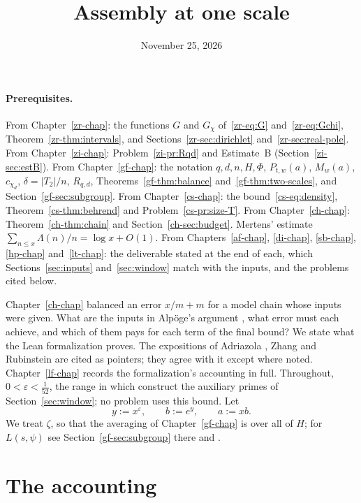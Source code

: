 \documentclass[reqno]{amsart}
\title{Assembly at one scale}
\author{}
\date{November 25, 2026}
\newcounter{chap}
\theoremstyle{definition}
\theoremstyle{plain}
\begin{document}
\maketitle
{}\label{chap}

\paragraph{Prerequisites.}
From Chapter~\ref{zr-chap}: the functions \(G\) and \(G_\chi\) of~\eqref{zr-eq:G} and~\eqref{zr-eq:Gchi}, Theorem~\ref{zr-thm:intervals}, and Sections~\ref{zr-sec:dirichlet} and~\ref{zr-sec:real-pole}.  From Chapter~\ref{zi-chap}: Problem~\ref{zi-pr:Rqd} and Estimate~B (Section~\ref{zi-sec:estB}).  From Chapter~\ref{gf-chap}: the notation \(q, d, n, H, \Phi\), \(P_{t,w}(a)\), \(M_w(a)\), \(c_{\chi_d}\), \(\delta = \lvert T_2\rvert/n\), \(R_{q,d}\), Theorems~\ref{gf-thm:balance} and~\ref{gf-thm:two-scales}, and Section~\ref{gf-sec:subgroup}.  From Chapter~\ref{cs-chap}: the bound~\eqref{cs-eq:density}, Theorem~\ref{cs-thm:behrend} and Problem~\ref{cs-pr:size-T}.  From Chapter~\ref{ch-chap}: Theorem~\ref{ch-thm:chain} and Section~\ref{ch-sec:budget}.  Mertens' estimate \(\sum_{n \le x}\Lambda(n)/n = \log x + O(1)\).  From Chapters~\ref{af-chap}, \ref{di-chap}, \ref{sb-chap}, \ref{hp-chap} and~\ref{lt-chap}: the deliverable stated at the end of each, which Sections~\ref{sec:inputs} and~\ref{sec:window} match with the inputs, and the problems cited below.

\medskip
Chapter~\ref{ch-chap} balanced an error \(x/m + m\) for a model chain whose inputs were given.  What are the inputs in Alp\"oge's argument \cite{Alp}, what error must each achieve, and which of them pays for each term of the final bound?  We state what the Lean formalization \cite{Lean} proves.  The expositions of Adriazola \cite{Adr}, Zhang \cite[\S\S4 and~6]{Zh} and Rubinstein \cite[\S\S I.5--I.8]{Rub} are cited as pointers; they agree with it except where noted.  Chapter~\ref{lf-chap} records the formalization's accounting in full.  Throughout, \(0 < \varepsilon < \frac1{52}\), the range in which \cite[Thms.~5.10 and~5.12]{Adr} construct the auxiliary primes of Section~\ref{sec:window}; no problem uses this bound.  Let
\[
  y := x^\varepsilon , \qquad b := e^{y} , \qquad a := xb .
\]
We treat \(\zeta\), so that the averaging of Chapter~\ref{gf-chap} is over all of \(H\); for \(L(s,\psi)\) see Section~\ref{gf-sec:subgroup} there and \cite[\S6]{Adr}.

\section{The accounting}\label{sec:acct}
\end{document}
